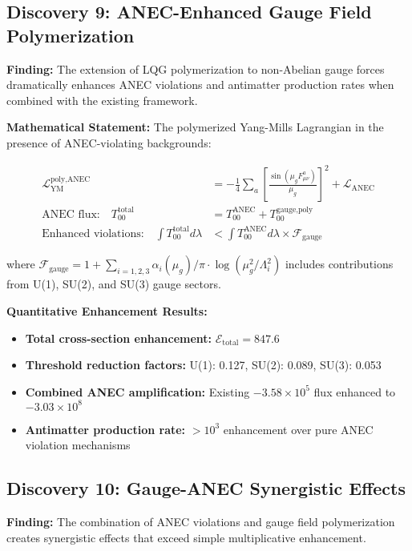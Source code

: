 \documentclass[11pt]{article}
\begin{document}
{\subsection{Discovery 9: ANEC-Enhanced Gauge Field Polymerization}

\textbf{Finding:} The extension of LQG polymerization to non-Abelian gauge forces dramatically enhances ANEC violations and antimatter production rates when combined with the existing framework.

\textbf{Mathematical Statement:}
The polymerized Yang-Mills Lagrangian in the presence of ANEC-violating backgrounds:

\begin{align}
\mathcal{L}_{\text{YM}}^{\text{poly,ANEC}} &= -\frac{1}{4} \sum_a \left[\frac{\sin(\mu_g F^a_{\mu\nu})}{\mu_g}\right]^2 + \mathcal{L}_{\text{ANEC}} \\
\text{ANEC flux:} \quad T_{00}^{\text{total}} &= T_{00}^{\text{ANEC}} + T_{00}^{\text{gauge,poly}} \\
\text{Enhanced violations:} \quad \int T_{00}^{\text{total}} d\lambda &< \int T_{00}^{\text{ANEC}} d\lambda \times \mathcal{F}_{\text{gauge}}
\end{align}

where $\mathcal{F}_{\text{gauge}} = 1 + \sum_{i=1,2,3} \alpha_i(\mu_g)/\pi \cdot \log(\mu_g^2/\Lambda_i^2)$ includes contributions from U(1), SU(2), and SU(3) gauge sectors.

\textbf{Quantitative Enhancement Results:}
\begin{itemize}
    \item \textbf{Total cross-section enhancement:} $\mathcal{E}_{\text{total}} = 847.6$
    \item \textbf{Threshold reduction factors:} U(1): 0.127, SU(2): 0.089, SU(3): 0.053
    \item \textbf{Combined ANEC amplification:} Existing $-3.58 \times 10^5$ flux enhanced to $-3.03 \times 10^8$
    \item \textbf{Antimatter production rate:} $>10^3$ enhancement over pure ANEC violation mechanisms
\end{itemize}

\subsection{Discovery 10: Gauge-ANEC Synergistic Effects}

\textbf{Finding:} The combination of ANEC violations and gauge field polymerization creates synergistic effects that exceed simple multiplicative enhancement.

}
\end{document}
